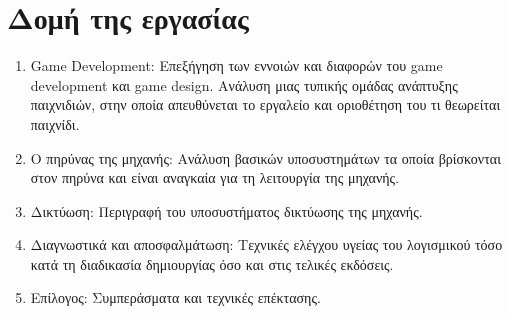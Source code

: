 \section{Δομή της εργασίας}
\begin{enumerate}
	\item{Game Development}: Επεξήγηση των εννοιών και διαφορών του game development και game design. Ανάλυση μιας τυπικής ομάδας ανάπτυξης παιχνιδιών, στην οποία απευθύνεται το εργαλείο και οριοθέτηση του τι θεωρείται παιχνίδι.
	\item{Ο πηρύνας της μηχανής}: Ανάλυση βασικών υποσυστημάτων τα οποία βρίσκονται στον πηρύνα και είναι αναγκαία για τη λειτουργία της μηχανής.
	\item{Δικτύωση}: Περιγραφή του υποσυστήματος δικτύωσης της μηχανής.
	\item{Διαγνωστικά και αποσφαλμάτωση}: Τεχνικές ελέγχου υγείας του λογισμικού τόσο κατά τη διαδικασία δημιουργίας όσο και στις τελικές εκδόσεις.
	\item{Επίλογος}: Συμπεράσματα και τεχνικές επέκτασης.
\end{enumerate}
